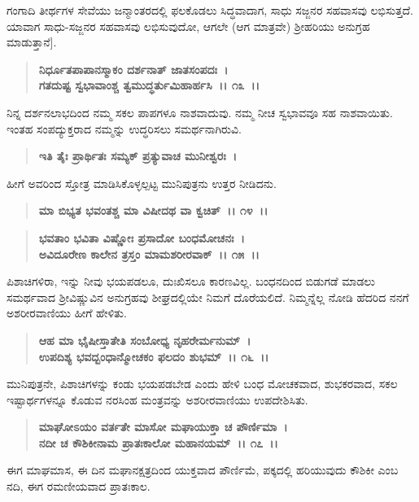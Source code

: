 ಗಂಗಾದಿ ತೀರ್ಥಗಳ ಸೇವೆಯು ಜನ್ಮಾಂತರದಲ್ಲಿ ಫಲಕೊಡಲು ಸಿದ್ಧವಾದಾಗ, ಸಾಧು ಸಜ್ಜನರ ಸಹವಾಸವು ಲಭಿಸುತ್ತದೆ. ಯಾವಾಗ ಸಾಧು-ಸಜ್ಜನರ ಸಹವಾಸವು ಲಭಿಸುವುದೋ, ಆಗಲೇ (ಆಗ ಮಾತ್ರವೇ) ಶ‍್ರೀಹರಿಯು ಅನುಗ್ರಹ ಮಾಡುತ್ತಾನೆ].

\begin{verse}
\textbf{ನಿರ್ಧೂತಪಾಪಾನಸ್ಮಾಕಂ ದರ್ಶನಾತ್ ಜಾತಸಂಪದಃ~।}\\\textbf{ಗತದುಷ್ಟ ಸ್ವಭಾವಾಂಶ್ಚ ತ್ವಮುದ್ಧರ್ತುಮಿಹಾರ್ಹಸಿ~।। ೧೩~।।}
\end{verse}

ನಿನ್ನ ದರ್ಶನಲಾಭದಿಂದ ನಮ್ಮ ಸಕಲ ಪಾಪಗಳೂ ನಾಶವಾದುವು. ನಮ್ಮ ನೀಚ ಸ್ವಭಾವವೂ ಸಹ ನಾಶವಾಯಿತು. ಇಂತಹ ಸಂಪದ್ಯುಕ್ತರಾದ ನಮ್ಮನ್ನು ಉದ್ಧರಿಸಲು ಸಮರ್ಥನಾಗಿರುವಿ.

\begin{verse}
\textbf{ಇತಿ ತೈಃ ಪ್ರಾರ್ಥಿತಃ ಸಮ್ಯಕ್ ಪ್ರತ್ಯುವಾಚ ಮುನೀಶ್ವರಃ~।}
\end{verse}

ಹೀಗೆ ಅವರಿಂದ ಸ್ತೋತ್ರ ಮಾಡಿಸಿಕೊಳ್ಳಲ್ಪಟ್ಟ ಮುನಿಪುತ್ರನು ಉತ್ತರ ನೀಡಿದನು.

\begin{verse}
\textbf{ಮಾ ಬಿಭ್ಯತ ಭವಂತಶ್ಚ ಮಾ ವಿಷೀದಥ ವಾ ಕ್ವಚಿತ್~।। ೧೪~।।} 
\end{verse}

\begin{verse}
\textbf{ಭವತಾಂ ಭವಿತಾ ವಿಷ್ಣೋಃ ಪ್ರಸಾದೋ ಬಂಧಮೋಚನಃ~।}\\\textbf{ಅವಿದೂರೇಣ ಕಾಲೇನ ತ್ರಸ್ತಂ ಮಾಮಶರೀರವಾಕ್~।। ೧೫~।।}
\end{verse}

ಪಿಶಾಚಿಗಳಿರಾ, ಇನ್ನು ನೀವು ಭಯಪಡಲೂ, ದುಃಖಿಸಲೂ ಕಾರಣವಿಲ್ಲ. ಬಂಧನದಿಂದ ಬಿಡುಗಡೆ ಮಾಡಲು ಸಮರ್ಥವಾದ ಶ‍್ರೀವಿಷ್ಣುವಿನ ಅನುಗ್ರಹವು ಶೀಘ್ರದಲ್ಲಿಯೇ ನಿಮಗೆ ದೊರೆಯಲಿದೆ. ನಿಮ್ಮನ್ನೆಲ್ಲ ನೋಡಿ ಹೆದರಿದ ನನಗೆ ಅಶರೀರವಾಣಿಯು ಹೀಗೆ ಹೇಳಿತು.

\begin{verse}
\textbf{ಆಹ ಮಾ ಭೈಷೀಸ್ತಾತೇತಿ ಸಂಬೋಧ್ಯ ನೃಹರೇರ್ಮನುಮ್~।}\\\textbf{ಉಪದಿಶ್ಯ ಭವದ್ಬಂಧಾನ್ಮೋಚಕಂ ಫಲದಂ ಶುಭಮ್~।। ೧೬~।।}
\end{verse}

ಮುನಿಪುತ್ರನೇ, ಪಿಶಾಚಿಗಳನ್ನು ಕಂಡು ಭಯಪಡಬೇಡ ಎಂದು ಹೇಳಿ ಬಂಧ ಮೋಚಕವಾದ, ಶುಭಕರವಾದ, ಸಕಲ ಇಷ್ಟಾರ್ಥಗಳನ್ನೂ ಕೊಡುವ ನರಸಿಂಹ ಮಂತ್ರವನ್ನು ಅಶರೀರ\-ವಾಣಿಯು ಉಪದೇಶಿಸಿತು.

\begin{verse}
\textbf{ಮಾಘೋಽಯಂ ವರ್ತತೇ ಮಾಸೋ ಮಘಾಯುಕ್ತಾ ಚ ಪೌರ್ಣಿಮಾ~।}\\\textbf{ನದೀ ಚ ಕೌಶಿಕೀನಾಮ ಪ್ರಾತಃಕಾಲೋ ಮಹಾನಯಮ್~।। ೧೭~।।}
\end{verse}

ಈಗ ಮಾಘಮಾಸ, ಈ ದಿನ ಮಘಾನಕ್ಷತ್ರದಿಂದ ಯುಕ್ತವಾದ ಪೌರ್ಣಿಮೆ, ಪಕ್ಕದಲ್ಲಿ ಹರಿಯುವುದು ಕೌಶಿಕೀ ಎಂಬ ನದಿ, ಈಗ ರಮಣೀಯವಾದ ಪ್ರಾತಃಕಾಲ.

